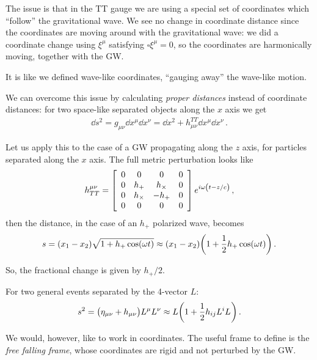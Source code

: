 \documentclass[main.tex]{subfiles}
\begin{document}
The issue is that in the TT gauge we are using a special set of coordinates which ``follow'' the gravitational wave. 
We see no change in coordinate distance since the coordinates are moving around with the gravitational wave: we did a coordinate change using \(\xi^{\mu }\) satisfying \(\square \xi^{\mu } = 0\), so the coordinates are harmonically moving, together with the GW. 

It is like we defined wave-like coordinates, ``gauging away'' the wave-like motion. 

We can overcome this issue by calculating \emph{proper distances} instead of coordinate distances: for two space-like separated objects along the \(x\) axis we get
%
\begin{align}
\dd{s^2} = g_{\mu \nu } \dd{x^{\mu }} \dd{x^{\nu }} = \dd{x^2} + h^{TT}_{\mu \nu } \dd{x^{\mu }} \dd{x^{\nu }} 
\,.
\end{align}

Let us apply this to the case of a GW propagating along the \(z\) axis, for particles separated along the \(x\) axis. The full metric perturbation looks like 
%
\begin{subequations}
\begin{align}
h^{\mu \nu }_{TT} = \left[\begin{array}{cccc}
0 & 0 & 0 & 0 \\ 
0 & h_{+} & h_{ \times} & 0 \\ 
0 & h_{ \times } & - h_{+} & 0 \\ 
0 & 0 & 0 & 0
\end{array}\right] e^{i \omega \qty(t - z/c)}
\,,
\end{align}
\end{subequations}
%
then the distance, in the case of an \(h_{+}\) polarized wave, becomes 
%
\begin{align}
s = (x_1 - x_2 ) \sqrt{1 + h_{+} \cos(\omega t)}
\approx (x_1 -x_2 ) \qty(1 + \frac{1}{2} h_{+} \cos(\omega t))
\,.
\end{align}

So, the fractional change is given by \(h_{+} / 2\). 

For two general events separated by the 4-vector \(L\): 
%
\begin{align}
s^2 = \qty(\eta_{\mu \nu } + h_{\mu \nu } )L^{\mu } L^{\nu }
\approx L \qty(1 + \frac{1}{2} h_{ij} L^{i} L^{})
\,.
\end{align}

We would, however, like to work in coordinates. 
The useful frame to define is the \emph{free falling frame}, whose coordinates are rigid and not perturbed by the GW. 
\end{document}
